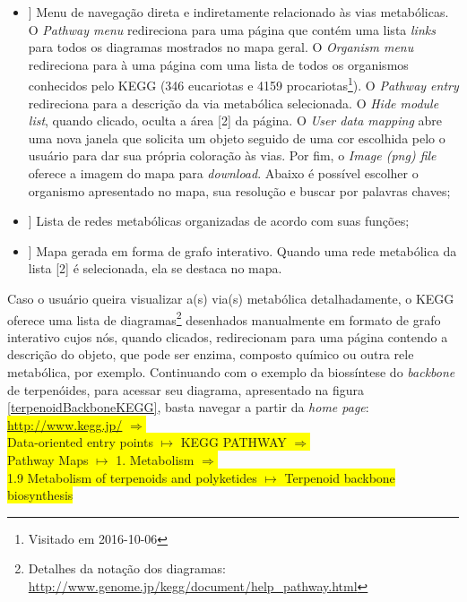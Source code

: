 \begin{itemize}
\item[[ 1]] Menu de navegação direta e indiretamente relacionado às vias metabólicas. O \textit{Pathway menu} redireciona para uma página que contém uma lista \textit{links} para todos os diagramas mostrados no mapa geral. O \textit{Organism menu} redireciona para à uma página com uma lista de todos os organismos conhecidos pelo KEGG (346 eucariotas e 4159 procariotas\footnote{Visitado em 2016-10-06}). O \textit{Pathway entry} redireciona para a descrição da via metabólica selecionada. O \textit{Hide module list}, quando clicado, oculta a área [2] da página. O \textit{User data mapping} abre uma nova janela que solicita um objeto seguido de uma cor escolhida pelo o usuário para dar sua própria coloração às vias. Por fim, o \textit{Image (png) file} oferece a imagem do mapa para \textit{download}. Abaixo é possível escolher o organismo apresentado no mapa, sua resolução e buscar por palavras chaves;
\item[[ 2]] Lista de redes metabólicas organizadas de acordo com suas funções;
\item[[ 3]] Mapa gerada em forma de grafo interativo. Quando uma rede metabólica da lista [2] é selecionada, ela se destaca no mapa.
\end{itemize}

\indent Caso o usuário queira visualizar a(s) via(s) metabólica detalhadamente, o KEGG oferece uma lista de diagramas\footnote{Detalhes da notação dos diagramas: \url{http://www.genome.jp/kegg/document/help_pathway.html}} desenhados manualmente em formato de grafo interativo cujos nós, quando clicados, redirecionam para uma página contendo a descrição do objeto, que pode ser enzima, composto químico ou outra rele metabólica, por exemplo. Continuando com o exemplo da biossíntese do \textit{backbone} de terpenóides, para acessar seu diagrama, apresentado na figura \ref{terpenoidBackboneKEGG}, basta navegar a partir da \textit{home page}: \\

\indent \colorbox{yellow}{\url{http://www.kegg.jp/} $\Rightarrow$} \\
\indent \colorbox{yellow}{Data-oriented entry points  $\mapsto$ KEGG PATHWAY $\Rightarrow$} \\
\indent \colorbox{yellow}{Pathway Maps $\mapsto$ 1. Metabolism  $\Rightarrow$} \\
\indent \colorbox{yellow}{1.9 Metabolism of terpenoids and polyketides  $\mapsto$ Terpenoid backbone biosynthesis} \\

